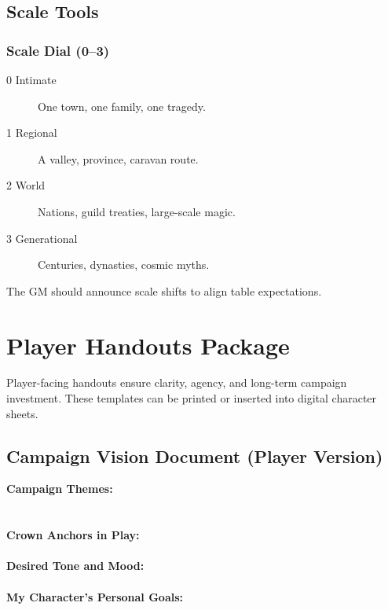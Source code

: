 \documentclass[11pt]{article}
\begin{document}
\subsection{Scale Tools}

\subsubsection{Scale Dial (0--3)}
\begin{description}
    \item[0 Intimate] One town, one family, one tragedy.
    \item[1 Regional] A valley, province, caravan route.
    \item[2 World] Nations, guild treaties, large-scale magic.
    \item[3 Generational] Centuries, dynasties, cosmic myths.
\end{description}

The GM should announce scale shifts to align table expectations.


\section{Player Handouts Package}
\label{appendix:player-handouts}

Player-facing handouts ensure clarity, agency, and long-term campaign investment. 
These templates can be printed or inserted into digital character sheets.

\subsection{Campaign Vision Document (Player Version)}

\begin{tcolorbox}[
  title=\textbf{Campaign Vision Sheet},
  colback=gray!10,
  colframe=black,
  fonttitle=\bfseries,
  sharp corners,
  enhanced
,breakable]
\textbf{Campaign Themes:} \\
\underline{\phantom{XXXXXXXXXXXXXXXXXXXXXXXXXXXX}} \\
\underline{\phantom{XXXXXXXXXXXXXXXXXXXXXXXXXXXX}} \\

\textbf{Crown Anchors in Play:} \\
\underline{\phantom{XXXXXXXXXXXXXXXXXXXXXXXXXXXX}} \\

\textbf{Desired Tone and Mood:} \\
\underline{\phantom{XXXXXXXXXXXXXXXXXXXXXXXXXXXX}} \\

\textbf{My Character's Personal Goals:} \\
\underline{\phantom{XXXXXXXXXXXXXXXXXXXXXXXXXXXX}} \\
\end{tcolorbox}
\end{document}
